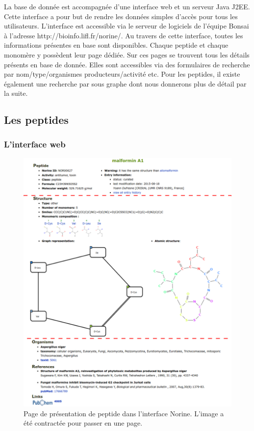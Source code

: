 La base de donnée est accompagnée d'une interface web et un serveur Java J2EE.
Cette interface a pour but de rendre les données simples d'accès pour tous les utilisateurs.
L'interface est accessible via le serveur de logiciels de l'équipe Bonsai à l'adresse http://bioinfo.lifl.fr/norine/.
Au travers de cette interface, toutes les informations présentes en base sont disponibles.
Chaque peptide et chaque monomère y possèdent leur page dédiée.
Sur ces pages se trouvent tous les détails présents en base de donnée.
Elles sont accessibles via des formulaires de recherche par nom/type/organismes producteurs/activité etc.
Pour les peptides, il existe également une recherche par sous graphe dont nous donnerons plus de détail par la suite.



\subsection{Les peptides}

\subsubsection{L'interface web}

\begin{figure}[h!]
  \begin{center}
    \includegraphics[width=450px]{Figures/Norine/malformin_nor.png}
    \caption{\label{interface}Page de présentation de peptide dans l'interface Norine.
    L'image a été contractée pour passer en une page.}
  \end{center}
\end{figure}

